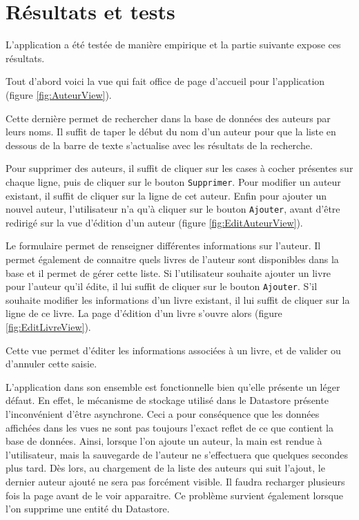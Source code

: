 \chapter{Résultats et tests}
L'application a été testée de manière empirique et la partie suivante expose ces résultats.

Tout d'abord voici la vue qui fait office de page d'accueil pour l'application (figure \ref{fig:AuteurView}).


Cette dernière permet de rechercher dans la base de données des auteurs par leurs noms. Il suffit de taper le début du nom d'un auteur pour que la liste en dessous de la barre de texte s'actualise avec les résultats de la recherche.

Pour supprimer des auteurs, il suffit de cliquer sur les cases à cocher présentes sur chaque ligne, puis de cliquer sur le bouton \verb|Supprimer|. Pour modifier un auteur existant, il suffit de cliquer sur la ligne de cet auteur. Enfin pour ajouter un nouvel auteur, l'utilisateur n'a qu'à cliquer sur le bouton \verb|Ajouter|, avant d'être redirigé sur la vue d'édition d'un auteur (figure \ref{fig:EditAuteurView}).


Le formulaire permet de renseigner différentes informations sur l'auteur. Il permet également de connaitre quels livres de l'auteur sont disponibles dans la base et il permet de gérer cette liste. Si l'utilisateur souhaite ajouter un livre pour l'auteur qu'il édite, il lui suffit de cliquer sur le bouton \verb|Ajouter|. S'il souhaite modifier les informations d'un livre existant, il lui suffit de cliquer sur la ligne de ce livre. La page d'édition d'un livre s'ouvre alors (figure \ref{fig:EditLivreView}).


Cette vue permet d'éditer les informations associées à un livre, et de valider ou d'annuler cette saisie.

L'application dans son ensemble est fonctionnelle bien qu'elle présente un léger défaut. En effet, le mécanisme de stockage utilisé dans le Datastore présente l'inconvénient d'être asynchrone. Ceci a pour conséquence que les données affichées dans les vues ne sont pas toujours l'exact reflet de ce que contient la base de données. Ainsi, lorsque l'on ajoute un auteur, la main est rendue à l'utilisateur, mais la sauvegarde de l'auteur ne s'effectuera que quelques secondes plus tard. Dès lors, au chargement de la liste des auteurs qui suit l'ajout, le dernier auteur ajouté ne sera pas forcément visible. Il faudra recharger plusieurs fois la page avant de le voir apparaitre. Ce problème survient également lorsque l'on supprime une entité du Datastore.